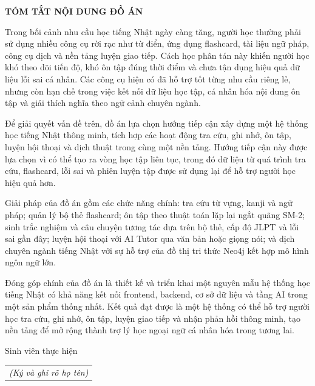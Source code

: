 \documentclass[../DoAn.tex]{subfiles}
\begin{document}
\begin{center}
    \Large{\textbf{TÓM TẮT NỘI DUNG ĐỒ ÁN}}\\
\end{center}
\vspace{1cm}

Trong bối cảnh nhu cầu học tiếng Nhật ngày càng tăng, người học thường phải sử dụng nhiều công cụ rời rạc như từ điển, ứng dụng flashcard, tài liệu ngữ pháp, công cụ dịch và nền tảng luyện giao tiếp. Cách học phân tán này khiến người học khó theo dõi tiến độ, khó ôn tập đúng thời điểm và chưa tận dụng hiệu quả dữ liệu lỗi sai cá nhân. Các công cụ hiện có đã hỗ trợ tốt từng nhu cầu riêng lẻ, nhưng còn hạn chế trong việc kết nối dữ liệu học tập, cá nhân hóa nội dung ôn tập và giải thích nghĩa theo ngữ cảnh chuyên ngành.

Để giải quyết vấn đề trên, đồ án lựa chọn hướng tiếp cận xây dựng một hệ thống học tiếng Nhật thông minh, tích hợp các hoạt động tra cứu, ghi nhớ, ôn tập, luyện hội thoại và dịch thuật trong cùng một nền tảng. Hướng tiếp cận này được lựa chọn vì có thể tạo ra vòng học tập liên tục, trong đó dữ liệu từ quá trình tra cứu, flashcard, lỗi sai và phiên luyện tập được sử dụng lại để hỗ trợ người học hiệu quả hơn.

Giải pháp của đồ án gồm các chức năng chính: tra cứu từ vựng, kanji và ngữ pháp; quản lý bộ thẻ flashcard; ôn tập theo thuật toán lặp lại ngắt quãng SM-2; sinh trắc nghiệm và câu chuyện tương tác dựa trên bộ thẻ, cấp độ JLPT và lỗi sai gần đây; luyện hội thoại với AI Tutor qua văn bản hoặc giọng nói; và dịch chuyên ngành tiếng Nhật với sự hỗ trợ của đồ thị tri thức Neo4j kết hợp mô hình ngôn ngữ lớn.

Đóng góp chính của đồ án là thiết kế và triển khai một nguyên mẫu hệ thống học tiếng Nhật có khả năng kết nối frontend, backend, cơ sở dữ liệu và tầng AI trong một sản phẩm thống nhất. Kết quả đạt được là một hệ thống có thể hỗ trợ người học tra cứu, ghi nhớ, ôn tập, luyện giao tiếp và nhận phản hồi thông minh, tạo nền tảng để mở rộng thành trợ lý học ngoại ngữ cá nhân hóa trong tương lai.

\begin{flushright}
Sinh viên thực hiện\\
\begin{tabular}{@{}c@{}}
\textit{(Ký và ghi rõ họ tên)}
\end{tabular}
\end{flushright}
\end{document}
